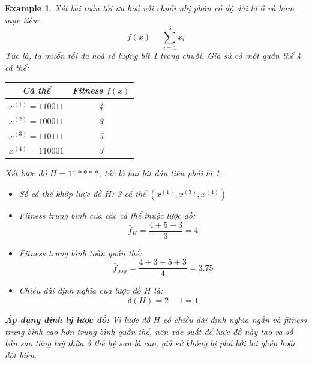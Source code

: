 \documentclass{book}
\newtheorem{example}{Example}
\begin{document}
        \begin{example}
            Xét bài toán tối ưu hoá với chuỗi nhị phân có độ dài là 6 và hàm mục tiêu:
            \[
            f(x) = \sum_{i=1}^6 x_i
            \]
            Tức là, ta muốn tối đa hoá số lượng bit 1 trong chuỗi. Giả sử có một quần thể 4 cá thể:
            
            \begin{center}
                \begin{tabular}{|c|c|}
                    \hline
                    Cá thể & Fitness \( f(x) \) \\
                    \hline
                    \( x^{(1)} = 110011 \) & 4 \\
                    \( x^{(2)} = 100011 \) & 3 \\
                    \( x^{(3)} = 110111 \) & 5 \\
                    \( x^{(4)} = 110001 \) & 3 \\
                    \hline
                \end{tabular}
            \end{center}
            
            Xét lược đồ \( H = 11**** \), tức là hai bit đầu tiên phải là 1.
            
            \begin{itemize}
                \item Số cá thể khớp lược đồ \( H \): 3 cá thể \((x^{(1)}, x^{(3)}, x^{(4)})\)
                \item Fitness trung bình của các cá thể thuộc lược đồ:
                \[
                \bar{f}_H = \frac{4 + 5 + 3}{3} = 4
                \]
                \item Fitness trung bình toàn quần thể:
                \[
                \bar{f}_{\text{pop}} = \frac{4 + 3 + 5 + 3}{4} = 3.75
                \]
                \item Chiều dài định nghĩa của lược đồ \( H \) là:
                \[
                \delta(H) = 2 - 1 = 1
                \]
            \end{itemize}
            
            \textbf{Áp dụng định lý lược đồ:}  
            Vì lược đồ \( H \) có chiều dài định nghĩa ngắn và fitness trung bình cao hơn trung bình quần thể, nên xác suất để lược đồ này tạo ra số bản sao tăng luỹ thừa ở thế hệ sau là cao, giả sử không bị phá bởi lai ghép hoặc đột biến.
        \end{example}
        
\end{document}
